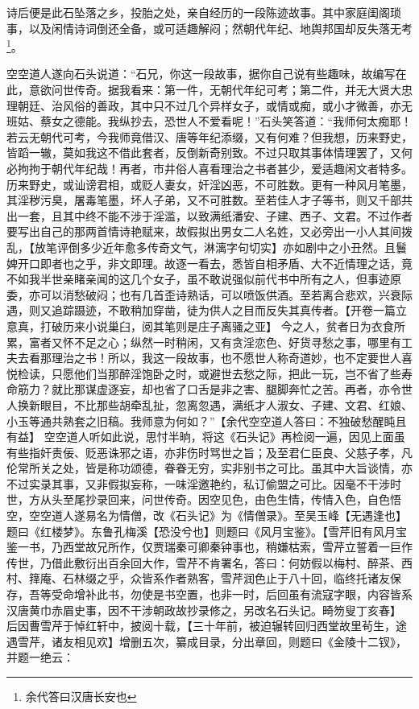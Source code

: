 \documentclass[12pt,oneside]{book}
\begin{document}
诗后便是此石坠落之乡，投胎之处，亲自经历的一段陈迹故事。其中家庭闺阁琐事，以及闲情诗词倒还全备，或可适趣解闷；然朝代年纪、地舆邦国却反失落无考\footnote{余代答曰汉唐长安也}。

空空道人遂向石头说道：“石兄，你这一段故事，据你自己说有些趣味，故编写在此，意欲问世传奇。据我看来：第一件，无朝代年纪可考；第二件，并无大贤大忠理朝廷、治风俗的善政，其中只不过几个异样女子，或情或痴，或小才微善，亦无班姑、蔡女之德能。我纵抄去，恐世人不爱看呢！”石头笑答道：“我师何太痴耶！若云无朝代可考，今我师竟借汉、唐等年纪添缀，又有何难？但我想，历来野史，皆蹈一辙，莫如我这不借此套者，反倒新奇别致。不过只取其事体情理罢了，又何必拘拘于朝代年纪哉！再者，市井俗人喜看理治之书者甚少，爱适趣闲文者特多。历来野史，或讪谤君相，或贬人妻女，奸淫凶恶，不可胜数。更有一种风月笔墨，其淫秽污臭，屠毒笔墨，坏人子弟，又不可胜数。至若佳人才子等书，则又千部共出一套，且其中终不能不涉于淫滥，以致满纸潘安、子建、西子、文君。不过作者要写出自己的那两首情诗艳赋来，故假拟出男女二人名姓，又必旁出一小人其间拨乱，【放笔评倒多少近年愈多传奇文气，淋漓字句切实】亦如剧中之小丑然。且鬟婢开口即者也之乎，非文即理。故逐一看去，悉皆自相矛盾、大不近情理之话，竟不如我半世亲睹亲闻的这几个女子，虽不敢说强似前代书中所有之人，但事迹原委，亦可以消愁破闷；也有几首歪诗熟话，可以喷饭供酒。至若离合悲欢，兴衰际遇，则又追踪蹑迹，不敢稍加穿凿，徒为供人之目而反失其真传者。【开卷一篇立意真，打破历来小说巢臼，阅其笔则是庄子离骚之亚】
今之人，贫者日为衣食所累，富者又怀不足之心；纵然一时稍闲，又有贪淫恋色、好货寻愁之事，哪里有工夫去看那理治之书！所以，我这一段故事，也不愿世人称奇道妙，也不定要世人喜悦检读，只愿他们当那醉淫饱卧之时，或避世去愁之际，把此一玩，岂不省了些寿命筋力？就比那谋虚逐妄，却也省了口舌是非之害、腿脚奔忙之苦。再者，亦令世人换新眼目，不比那些胡牵乱扯，忽离忽遇，满纸才人淑女、子建、文君、红娘、小玉等通共熟套之旧稿。我师意为何如？”【余代空空道人答曰：不独破愁醒盹且有益】
空空道人听如此说，思忖半晌，将这《石头记》再检阅一遍，因见上面虽有些指奸责佞、贬恶诛邪之语，亦非伤时骂世之旨；及至君仁臣良、父慈子孝，凡伦常所关之处，皆是称功颂德，眷眷无穷，实非别书之可比。虽其中大旨谈情，亦不过实录其事，又非假拟妄称，一味淫邀艳约，私订偷盟之可比。因毫不干涉时世，方从头至尾抄录回来，问世传奇。因空见色，由色生情，传情入色，自色悟空，空空道人遂易名为情僧，改《石头记》为《情僧录》。至吴玉峰【无遇逢也】题曰《红楼梦》。东鲁孔梅溪【恐没兮也】则题曰《风月宝鉴》。【雪芹旧有风月宝鉴一书，乃西堂故兄所作，仅贾瑞秦可卿秦钟事也，稍嫌枯索，雪芹立誓着一巨作传世，乃借此敷衍出百余回大作，雪芹不肯署名，答曰：何妨假以梅村、醉茶、西村、箨庵、石林缀之乎，众皆系作者熟客，雪芹润色止于八十回，临终托诸友保存，吾等受命增补此书，勿使是书空置，也非一时，后回虽有流寇字眼，内容皆系汉唐黄巾赤眉史事，因不干涉朝政故抄录修之，另改名石头记。畸笏叟丁亥春】
后因曹雪芹于悼红轩中，披阅十载，【三十年前，被迫辗转回归西堂故里茍生，途遇雪芹，诸友相见欢】增删五次，纂成目录，分出章回，则题曰《金陵十二钗》，并题一绝云：
\end{document}
